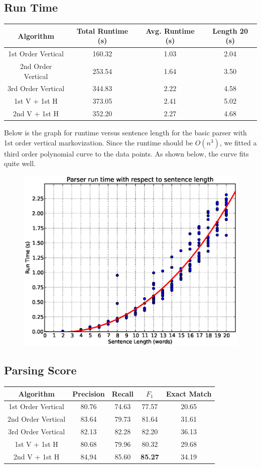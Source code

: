 \documentclass[12pt]{article}
\begin{document}
\subsection{Run Time}
\begin{center}
\begin{tabular}{|c|c|c|c|}
\hline
Algorithm & Total Runtime (s) & Avg. Runtime (s) & Length 20 (s)\\\hline
1st Order Vertical & 160.32 & 1.03 & 2.04 \\\hline
2nd Order Vertical & 253.54 & 1.64 & 3.50 \\\hline
3rd Order Vertical & 344.83  & 2.22 & 4.58 \\\hline
1st V + 1st H & 373.05 & 2.41 & 5.02 \\\hline
2nd V + 1st H & 352.20 & 2.27 & 4.68 \\\hline
\end{tabular}
\end{center}
Below is the graph for runtime versus sentence length for the basic parser with 1st order vertical markovization. Since the runtime should be $O(n^3)$, we fitted a third order polynomial curve to the data points. As shown below, the curve fits quite well.
\begin{figure}[H]
\centering
\includegraphics[width=0.5\linewidth]{./stats/runtime}
\end{figure}
\subsection{Parsing Score}
\begin{center}
\begin{tabular}{|c|c|c|c|c|}
\hline
Algorithm & Precision & Recall & $F_1$ & Exact Match \\\hline
1st Order Vertical & 80.76 & 74.63 & 77.57 & 20.65\\\hline
2nd Order Vertical & 83.64 & 79.73 & 81.64 & 31.61 \\\hline
3rd Order Vertical & 82.13 & 82.28 & 82.20 & 36.13 \\\hline
1st V + 1st H & 80.68 & 79.96 & 80.32 & 29.68 \\\hline
2nd V + 1st H & 84,94 & 85.60 & \textbf{85.27} & 34.19 \\\hline
\end{tabular}
\end{center}
\end{document}
